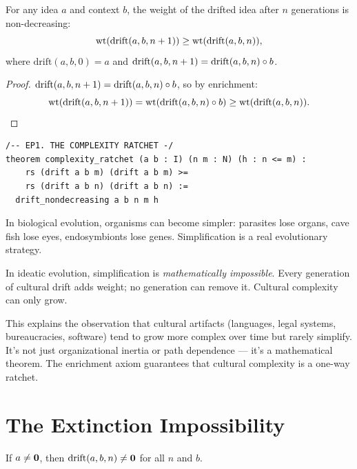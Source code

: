 \begin{theorem}
\label{thm:complexity-ratchet}
For any idea $a$ and context $b$, the weight of the drifted idea after $n$ generations is non-decreasing:
\[
\operatorname{wt}(\text{drift}(a,b,n+1)) \geq \operatorname{wt}(\text{drift}(a,b,n)),
\]
where $\text{drift}(a,b,0) = a$ and $\text{drift}(a,b,n+1) = \text{drift}(a,b,n) \circ b$.
\end{theorem}

\begin{proof}
$\text{drift}(a,b,n+1) = \text{drift}(a,b,n) \circ b$, so by enrichment:
\[
\operatorname{wt}(\text{drift}(a,b,n+1)) = \operatorname{wt}(\text{drift}(a,b,n) \circ b) \geq \operatorname{wt}(\text{drift}(a,b,n)).
\]
\end{proof}

\begin{lstlisting}
/-- EP1. THE COMPLEXITY RATCHET -/
theorem complexity_ratchet (a b : I) (n m : N) (h : n <= m) :
    rs (drift a b m) (drift a b m) >=
    rs (drift a b n) (drift a b n) :=
  drift_nondecreasing a b n m h
\end{lstlisting}

\begin{paradox}
In biological evolution, organisms can become simpler: parasites lose organs, cave fish lose eyes, endosymbionts lose genes. Simplification is a real evolutionary strategy.

In ideatic evolution, simplification is \emph{mathematically impossible}. Every generation of cultural drift adds weight; no generation can remove it. Cultural complexity can only grow.

This explains the observation that cultural artifacts (languages, legal systems, bureaucracies, software) tend to grow more complex over time but rarely simplify. It's not just organizational inertia or path dependence --- it's a mathematical theorem. The enrichment axiom guarantees that cultural complexity is a one-way ratchet.
\end{paradox}

\section{The Extinction Impossibility}

\begin{theorem}
\label{thm:no-extinction}
If $a \neq \mathbf{0}$, then $\text{drift}(a, b, n) \neq \mathbf{0}$ for all $n$ and $b$.
\end{theorem}

